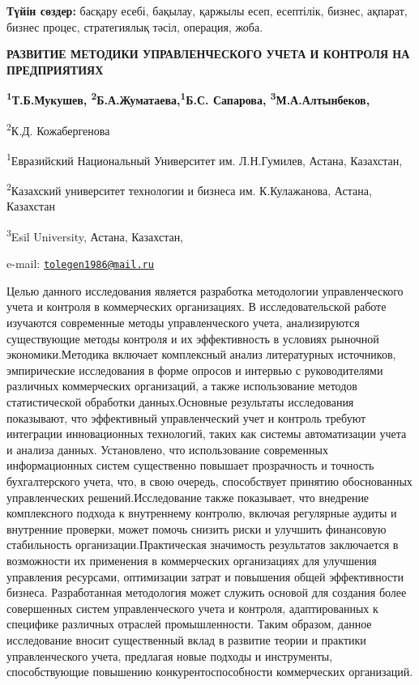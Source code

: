 {\bfseries Түйін сөздер:} басқару есебі, бақылау, қаржылы есеп, есептілік,
бизнес, ақпарат, бизнес процес, стратегиялық тәсіл, операция, жоба.
\begin{articleheader}

{\bfseries РАЗВИТИЕ МЕТОДИКИ УПРАВЛЕНЧЕСКОГО УЧЕТА И КОНТРОЛЯ НА
ПРЕДПРИЯТИЯХ}

{\bfseries \textsuperscript{1}Т.Б.Мукушев\textsuperscript{\envelope },
\textsuperscript{2}Б.А.Жуматаева,\textsuperscript{1}Б.С. Сапарова, 
\textsuperscript{3}М.А.Алтынбеков,

\textsuperscript{2}К.Д. Кожабергенова}
\end{articleheader}

\begin{affiliation}

\textsuperscript{1}Евразийский Национальный Университет им. Л.Н.Гумилев,
Астана, Казахстан,

\textsuperscript{2}Казахский университет технологии и бизнеса им.
К.Кулажанова, Астана, Казахстан

\textsuperscript{3}Esil University, Астана, Казахстан,

e-mail:
\href{mailto:tolegen1986@mail.ru}{\nolinkurl{tolegen1986@mail.ru}}
\end{affiliation}

Целью данного исследования является разработка методологии
управленческого учета и контроля в коммерческих организациях. В
исследовательской работе изучаются современные методы управленческого
учета, анализируются существующие методы контроля и их эффективность в
условиях рыночной экономики.Методика включает комплексный анализ
литературных источников, эмпирические исследования в форме опросов и
интервью с руководителями различных коммерческих организаций, а также
использование методов статистической обработки данных.Основные
результаты исследования показывают, что эффективный управленческий учет
и контроль требуют интеграции инновационных технологий, таких как
системы автоматизации учета и анализа данных. Установлено, что
использование современных информационных систем существенно повышает
прозрачность и точность бухгалтерского учета, что, в свою очередь,
способствует принятию обоснованных управленческих решений.Исследование
также показывает, что внедрение комплексного подхода к внутреннему
контролю, включая регулярные аудиты и внутренние проверки, может помочь
снизить риски и улучшить финансовую стабильность
организации.Практическая значимость результатов заключается в
возможности их применения в коммерческих организациях для улучшения
управления ресурсами, оптимизации затрат и повышения общей эффективности
бизнеса. Разработанная методология может служить основой для создания
более совершенных систем управленческого учета и контроля,
адаптированных к специфике различных отраслей промышленности. Таким
образом, данное исследование вносит существенный вклад в развитие теории
и практики управленческого учета, предлагая новые подходы и инструменты,
способствующие повышению конкурентоспособности коммерческих организаций.

